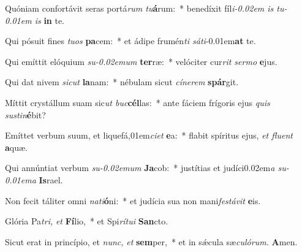 \item Quóniam confortávit seras portá\textit{rum tu}\textbf{á}rum:~* benedíxit fíl\textit{i\kern -0.02em is tu\kern -0.01em is} \textbf{in} te.
\item Qui pósuit fines \textit{tuos} \textbf{pa}cem:~* et ádipe frumén\textit{ti sáti}\kern -0.01em\textbf{at} te.
\item Qui emíttit elóquium \textit{su\kern -0.02emum} \textbf{ter}ræ:~* velóciter cur\textit{rit sermo} \textbf{e}jus.
\item Qui dat nivem \textit{sicut} \textbf{la}nam:~* nébulam sicut \textit{cínerem} \textbf{spár}git.
\item Míttit crystállum suam sic\textit{ut buc}\textbf{cél}las:~* ante fáciem frígoris ejus \textit{quis sus\-tin}\textbf{é}bit?
\item Emíttet verbum suum, et liquefá,01em\textit{ciet} \textbf{e}a:~* flabit spíritus ejus, \textit{et fluent} \textbf{a}quæ.
\item Qui annúntiat verbum \textit{su\kern-0.02emum} \textbf{Ja}cob:~* justítias et judíci\kern 0.02em\textit{a su\kern -0.01ema} \textbf{Is}rael.
\item Non fecit táliter omni \textit{nati}\textbf{ó}ni:~* et judícia sua non mani\textit{festávit} \textbf{e}is.
\item Glória Pa\hspace*{0.03em}\textit{tri,} \textit{et} \textbf{Fí}lio,~* et Spi\hspace*{0.03em}\textit{rítui} \textbf{San}cto.
\item Sicut erat in princípio, et \textit{nunc,} \textit{et} \textbf{sem}per,~* et in sǽcula sæ\hspace*{0.03em}\textit{culórum.} \textbf{A}men.